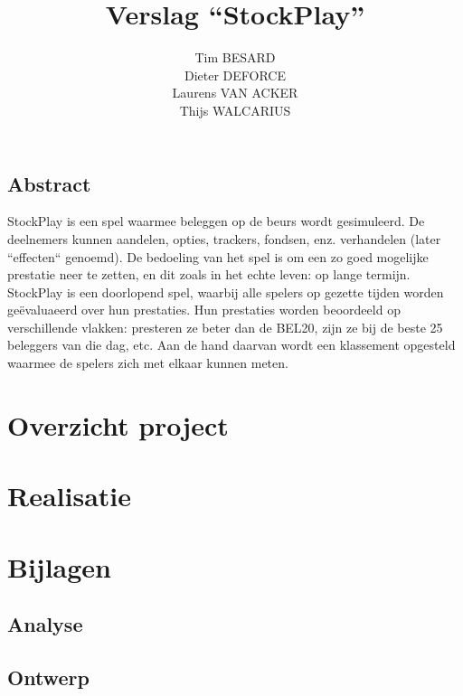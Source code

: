 \documentclass[a4paper,oneside,draft]{memoir}
\title{Verslag ``StockPlay''}
\author{
Tim BESARD\\
Dieter DEFORCE\\
Laurens VAN ACKER\\
Thijs WALCARIUS
}
\begin{document}
\maketitle
\maketitle
{}
\tableofcontents
{}


%
%

\chapter*{Abstract}
StockPlay is een spel waarmee beleggen op de beurs wordt gesimuleerd. De deelnemers kunnen aandelen, opties, trackers, fondsen, enz. verhandelen (later ``effecten`` genoemd). De bedoeling van het spel is om een zo goed mogelijke prestatie neer te zetten, en dit zoals in het echte leven: op lange termijn. StockPlay is een doorlopend spel, waarbij alle spelers op gezette tijden worden ge\"evaluaeerd over hun prestaties. Hun prestaties worden beoordeeld op verschillende vlakken: presteren ze beter dan de BEL20, zijn ze bij de beste 25 beleggers van die dag, etc. Aan de hand daarvan wordt een klassement opgesteld waarmee de spelers zich met elkaar kunnen meten.

\part{Overzicht project}
\label{pt:overzicht}


\part{Realisatie}
\label{pt:realisatie}



%
%

\part{Bijlagen}
\label{pt:bijlagen}
\appendix
\chapter{Analyse}
\label{pt:analyse}


\chapter{Ontwerp}
\label{chap:ontwerp}

\end{document}
